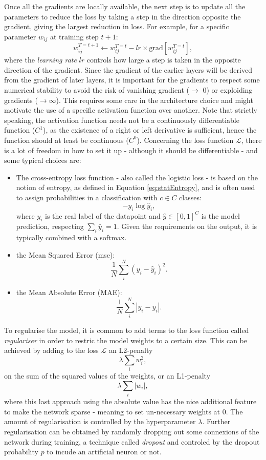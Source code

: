 Once all the gradients are locally available, the next step is to update all the parameters to reduce the loss by taking a step in the direction opposite the gradient, giving the largest reduction in loss. For example, for a specific parameter $w_{ij}$ at training step $t+1$:
\begin{equation}\label{eq:gradientdescent}
    w^{T=t+1}_{ij} \leftarrow w^{T=t}_{ij} - lr \times \text{grad}\left[w^{T=t}_{ij}\right],
\end{equation}
where the \textit{learning rate} $lr$ controls how large a step is taken in the opposite direction of the gradient. Since the gradient of the earlier layers will be derived from the gradient of later layers, it is important for the gradients to respect some numerical stability to avoid the risk of vanishing gradient ($\rightarrow$ 0) or exploiding gradients ($\rightarrow \infty$). This requires some care in the architecture choice and might motivate the use of a specific activation function over another. Note that strictly speaking, the activation function needs not be a continuously differentiable function ($C^1$), as the existence of a right or left derivative is sufficient, hence the function should at least be continuous ($C^0$). Concerning the loss function $\mathcal{L}$, there is a lot of freedom in how to set it up - although it should be differentiable - and some typical choices are:
\begin{itemize}
    \item The cross-entropy loss function - also called the logistic loss - is based on the notion of entropy, as defined in Equation \ref{eq:statEntropy}, and is often used to assign probabilities in a classification with $c \in C$ classes: \[ -y_i \log\hat{y}_i,\] where $y_i$ is the real label of the datapoint and $\hat{y} \in [0, 1]^C$ is the model prediction, respecting $\sum_i \hat{y}_i = 1$. Given the requirements on the output, it is typically combined with a softmax. 
    \item the Mean Squared Error (\gls{mse}): \[\frac{1}{N}\sum_i^N (y_i - \hat{y}_i)^2.\] 
    \item the Mean Absolute Error (MAE): \[\frac{1}{N}\sum_i^N |y_i - \hat{y}_i|.\]
\end{itemize} 
To regularise the model, it is common to add terms to the loss function called \textit{regulariser} in order to restric the model weights to a certain size. This can be achieved by adding to the loss $\mathcal{L}$ an L2-penalty \[\lambda \sum_i w_i^2,\] on the sum of the squared values of the weights, or an L1-penalty \[\lambda \sum_i |w_i|,\] where this last approach using the absolute value has the nice additional feature to make the network sparse - meaning to set un-necessary weights at 0. The amount of regularisation is controlled by the hyperparameter $\lambda$. Further regularisation can be obtained by randomly dropping out some connexions of the network during training, a technique called \textit{dropout} and controled by the dropout probability $p$ to incude an artificial neuron or not.

